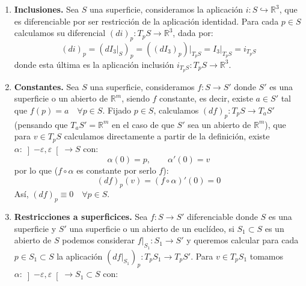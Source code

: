 \begin{ejemplo}
\begin{enumerate}
            \begin{equation*}
                F(p) = dist(p,R)^2 = |p-p_0|^2 - \langle p-p_0,u \rangle^2
            \end{equation*}
            Para una superficie $S$ consideramos $f=F\big|_S$, que para cada $p\in S$ y $v\in T_pS$ tenemos:
            \begin{equation*}
                (d f)_p(v) = 2\langle p-p_0,v \rangle  - 2\langle p-p_0,u \rangle \langle v,u \rangle 
            \end{equation*}
        \item[2.] \textbf{Inclusiones.} Sea $S$ una superficie, consideramos la aplicación $i:S\hookrightarrow \mathbb{R}^3$, que es diferenciable por ser restricción de la aplicación identidad. Para cada $p\in S$ calculamos su diferencial $(di)_p:T_pS\to \mathbb{R}^3$, dada por:
            \begin{equation*}
                (di)_p = \left(dI_3\big|_S\right)_p = \left((dI_3)_p\right)\big|_{T_pS} = I_3\big|_{T_pS} = i_{T_pS}
            \end{equation*}
            donde esta última es la aplicación inclusión $i_{T_pS}:T_pS\to \mathbb{R}^3$.
        \item[3.] \textbf{Constantes.} Sea $S$ una superficie, consideramos $f:S\to S'$ donde $S'$ es una superficie o un abierto de $\mathbb{R}^m$, siendo $f$ constante, es decir, existe $a\in S'$ tal que $f(p) = a\quad \forall p\in S$. Fijado $p\in S$, calculamos $(df)_p:T_pS\to T_aS'$ (pensando que $T_aS'=\mathbb{R}^m$ en el caso de que $S'$ sea un abierto de $\mathbb{R}^m$), que para $v\in T_pS$ calculamos directamente a partir de la definición, existe $\alpha:\left]-\varepsilon,\varepsilon\right[\to S$ con:
            \begin{equation*}
                \alpha(0) = p, \qquad \alpha'(0) = v
            \end{equation*}
            por lo que ($f\circ \alpha$ es constante por serlo $f$):
            \begin{equation*}
                (d f)_p(v) = (f\circ \alpha)'(0) = 0
            \end{equation*}
            Así, $(d f)_p\equiv 0\quad \forall p\in S$.
        \item[4.] \textbf{Restricciones a superficices.} Sea $f:S\to S'$ diferenciable donde $S$ es una superficie y $S'$ una superficie o un abierto de un euclídeo, si $S_1\subset S$ es un abierto de $S$ podemos considerar $f\big|_{S_1}:S_1\to S'$ y queremos calcular para cada $p\in S_1\subset S$ la aplicación $(d f\big|_{S_1})_p:T_pS_1\to T_pS'$. Para $v\in T_pS_1$ tomamos $\alpha:\left]-\varepsilon,\varepsilon\right[\to S_1\subset S$ con:

\end{enumerate}
\end{ejemplo}
